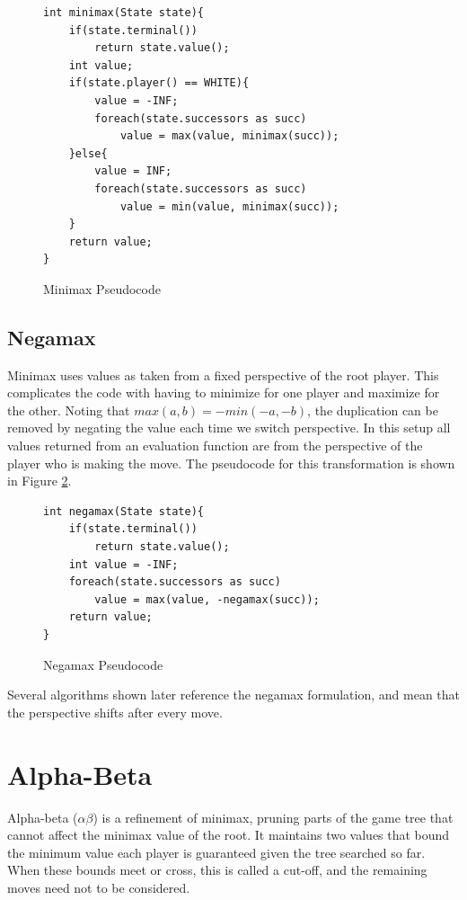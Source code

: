 \begin{figure}

\begin{lstlisting}
int minimax(State state){
	if(state.terminal())
		return state.value();
	int value;
	if(state.player() == WHITE){
		value = -INF;
		foreach(state.successors as succ)
			value = max(value, minimax(succ));
	}else{
		value = INF;
		foreach(state.successors as succ)
			value = min(value, minimax(succ));
	}
	return value;
}
\end{lstlisting}

\caption{Minimax Pseudocode}
\label{fig:minimaxcode}

\end{figure}


\subsection{Negamax}

Minimax uses values as taken from a fixed perspective of the root player. This complicates the code with having to minimize for one player and maximize for the other. Noting that $max(a,b) = -min(-a,-b)$, the duplication can be removed by negating the value each time we switch perspective. In this setup all values returned from an evaluation function are from the perspective of the player who is making the move. The pseudocode for this transformation is shown in Figure \ref{fig:negamaxcode}.

\begin{figure}

\begin{lstlisting}
int negamax(State state){
	if(state.terminal())
		return state.value();
	int value = -INF;
	foreach(state.successors as succ)
		value = max(value, -negamax(succ));
	return value;
}
\end{lstlisting}

\caption{Negamax Pseudocode}
\label{fig:negamaxcode}
\end{figure}

Several algorithms shown later reference the negamax formulation, and mean that the perspective shifts after every move.


\section{Alpha-Beta}\label{sec:alphabeta}

Alpha-beta ($\alpha\beta$) is a refinement of minimax, pruning parts of the game tree that cannot affect the minimax value of the root\cite{knuth1975alphabeta}. It maintains two values that bound the minimum value each player is guaranteed given the tree searched so far. When these bounds meet or cross, this is called a cut-off, and the remaining moves need not to be considered.

